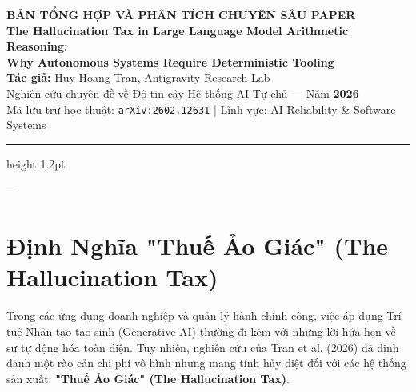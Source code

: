 \documentclass[11pt,a4paper]{article}
\begin{document}
\begin{center}
    {\Large\bfseries BẢN TỔNG HỢP VÀ PHÂN TÍCH CHUYÊN SÂU PAPER}\\[0.3cm]
    {\LARGE\bfseries The Hallucination Tax in Large Language Model Arithmetic Reasoning:}\\[0.2cm]
    {\LARGE\bfseries Why Autonomous Systems Require Deterministic Tooling}\\[0.4cm]
    {\normalsize\textbf{Tác giả:} Huy Hoang Tran, Antigravity Research Lab}\\[0.15cm]
    {\small Nghiên cứu chuyên đề về Độ tin cậy Hệ thống AI Tự chủ — Năm \textbf{2026}}\\[0.15cm]
    {\small Mã lưu trữ học thuật: \href{https://arxiv.org/abs/2602.12631}{\texttt{arXiv:2602.12631}} \quad | \quad Lĩnh vực: AI Reliability \& Software Systems}
\end{center}

\vspace{0.3cm}
\hrule height 1.2pt
\vspace{0.6cm}

---

\section{Định Nghĩa "Thuế Ảo Giác" (The Hallucination Tax)}

Trong các ứng dụng doanh nghiệp và quản lý hành chính công, việc áp dụng Trí tuệ Nhân tạo tạo sinh (Generative AI) thường đi kèm với những lời hứa hẹn về sự tự động hóa toàn diện. Tuy nhiên, nghiên cứu của Tran et al. (2026) đã định danh một rào cản chi phí vô hình nhưng mang tính hủy diệt đối với các hệ thống sản xuất: \textbf{"Thuế Ảo Giác" (The Hallucination Tax)}.
\end{document}
